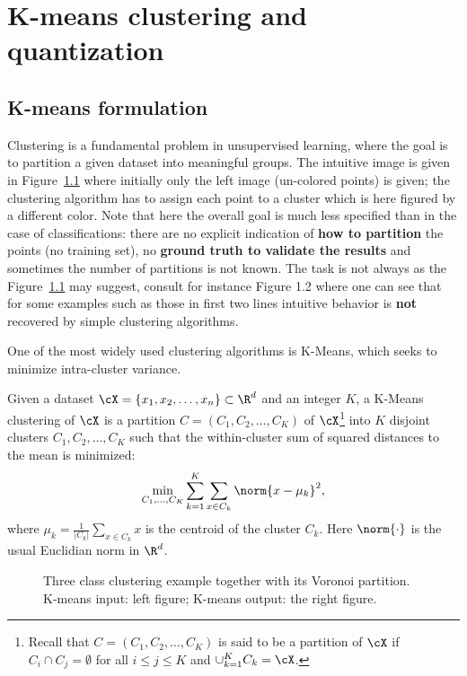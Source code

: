 \chapter{K-means clustering and quantization}

\section{K-means formulation}

Clustering is a fundamental problem in unsupervised learning, where the goal
is to partition a given dataset into meaningful groups. The intuitive image is
given in Figure~\ref{fig:ch8-three-class} where initially only the left image
(un-colored points) is given; the clustering algorithm has to assign each point
to a cluster which is here figured by a different color. Note that here the
overall goal is much less specified than in the case of classifications: there
are no explicit indication of \textbf{how to partition} the points (no training
set), no \textbf{ground truth to validate the results} and sometimes the number
of partitions is not known. The task is not always as the Figure~\ref{fig:ch8-three-class}
may suggest, consult for instance Figure 1.2 where one can see that for some
examples such as those in first two lines intuitive behavior is \textbf{not}
recovered by simple clustering algorithms.

One of the most widely used clustering algorithms is K-Means, which seeks to
minimize intra-cluster variance.

\begin{definition}
Given a dataset $\cX = \{x_1, x_2, \ldots, x_n\} \subset \R^d$ and an integer $K$,
a K-Means clustering of $\cX$ is a partition $C = (C_1, C_2, \ldots, C_K)$ of
$\cX$\footnote{Recall that $C = (C_1, C_2, \ldots, C_K)$ is said to be a
partition of $\cX$ if $C_i \cap C_j = \emptyset$ for all $i \le j \le K$ and
$\cup_{k=1}^{K} C_k = \cX$.} into $K$ disjoint clusters $C_1, C_2, \ldots, C_K$
such that the within-cluster sum of squared distances to the mean is minimized:
\begin{equation}\label{eq:ch8-kmeans-obj}
\min_{C_1, \ldots, C_K} \sum_{k=1}^{K} \sum_{x \in C_k} \norm{x - \mu_k}^2,
\end{equation}
where $\mu_k = \frac{1}{|C_k|} \sum_{x \in C_k} x$ is the centroid of the cluster
$C_k$. Here $\norm{\cdot}$ is the usual Euclidian norm in $\R^d$.
\end{definition}

\begin{figure}[h]\centering
\caption{Three class clustering example together with its Voronoi partition.
K-means input: left figure; K-means output: the right figure.}
\label{fig:ch8-three-class}
\end{figure}

